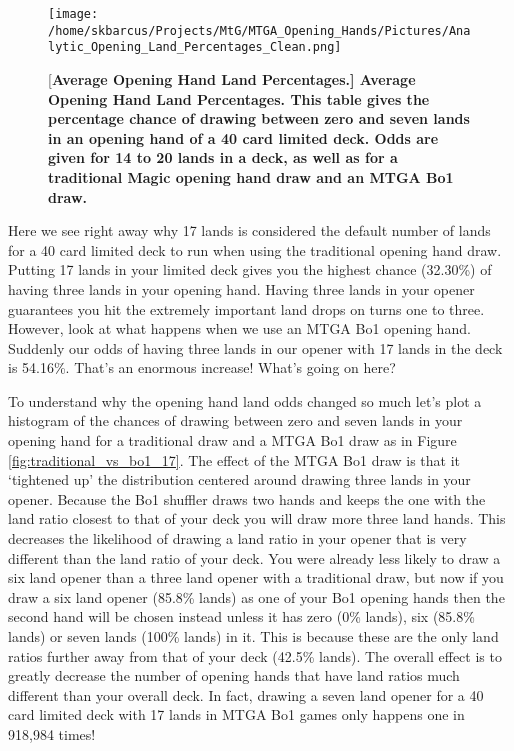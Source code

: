 \documentclass[oneside]{book}   %
\begin{document}
	\begin{figure}[!ht]
	\centering
	\centerline{\texttt{[image: /home/skbarcus/Projects/MtG/MTGA\_Opening\_Hands/Pictures/Analytic\_Opening\_Land\_Percentages\_Clean.png]}}
	[\bf{Average Opening Hand Land Percentages.}]{
	{\bf{Average Opening Hand Land Percentages.}} This table gives the percentage chance of drawing between zero and seven lands in an opening hand of a 40 card limited deck. Odds are given for 14 to 20 lands in a deck, as well as for a traditional Magic opening hand draw and an MTGA Bo1 draw.}
	\label{fig:opening_hand_percentages}
	\end{figure}	
	
Here we see right away why 17 lands is considered the default number of lands for a 40 card limited deck to run when using the traditional opening hand draw. Putting 17 lands in your limited deck gives you the highest chance (32.30\%) of having three lands in your opening hand. Having three lands in your opener guarantees you hit the extremely important land drops on turns one to three. However, look at what happens when we use an MTGA Bo1 opening hand. Suddenly our odds of having three lands in our opener with 17 lands in the deck is 54.16\%. That's an enormous increase! What's going on here?

To understand why the opening hand land odds changed so much let's plot a histogram of the chances of drawing between zero and seven lands in your opening hand for a traditional draw and a MTGA Bo1 draw as in Figure \ref{fig:traditional_vs_bo1_17}. The effect of the MTGA Bo1 draw is that it `tightened up' the distribution centered around drawing three lands in your opener. Because the Bo1 shuffler draws two hands and keeps the one with the land ratio closest to that of your deck you will draw more three land hands. This decreases the likelihood of drawing a land ratio in your opener that is very different than the land ratio of your deck. You were already less likely to draw a six land opener than a three land opener with a traditional draw, but now if you draw a six land opener (85.8\% lands) as one of your Bo1 opening hands then the second hand will be chosen instead unless it has zero (0\% lands), six (85.8\% lands) or seven lands (100\% lands) in it. This is because these are the only land ratios further away from that of your deck (42.5\% lands). The overall effect is to greatly decrease the number of opening hands that have land ratios much different than your overall deck. In fact, drawing a seven land opener for a 40 card limited deck with 17 lands in MTGA Bo1 games only happens one in 918,984 times!
\end{document}
